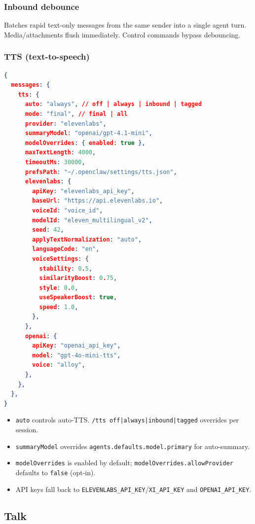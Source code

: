 \subsubsection{Inbound debounce}


Batches rapid text-only messages from the same sender into a single agent turn. Media/attachments flush immediately. Control commands bypass debouncing.

\subsubsection{TTS (text-to-speech)}


\begin{lstlisting}[language=json]
{
  messages: {
    tts: {
      auto: "always", // off | always | inbound | tagged
      mode: "final", // final | all
      provider: "elevenlabs",
      summaryModel: "openai/gpt-4.1-mini",
      modelOverrides: { enabled: true },
      maxTextLength: 4000,
      timeoutMs: 30000,
      prefsPath: "~/.openclaw/settings/tts.json",
      elevenlabs: {
        apiKey: "elevenlabs_api_key",
        baseUrl: "https://api.elevenlabs.io",
        voiceId: "voice_id",
        modelId: "eleven_multilingual_v2",
        seed: 42,
        applyTextNormalization: "auto",
        languageCode: "en",
        voiceSettings: {
          stability: 0.5,
          similarityBoost: 0.75,
          style: 0.0,
          useSpeakerBoost: true,
          speed: 1.0,
        },
      },
      openai: {
        apiKey: "openai_api_key",
        model: "gpt-4o-mini-tts",
        voice: "alloy",
      },
    },
  },
}
\end{lstlisting}


\begin{itemize}
  \item \texttt{auto} controls auto-TTS. \texttt{/tts off|always|inbound|tagged} overrides per session.
  \item \texttt{summaryModel} overrides \texttt{agents.defaults.model.primary} for auto-summary.
  \item \texttt{modelOverrides} is enabled by default; \texttt{modelOverrides.allowProvider} defaults to \texttt{false} (opt-in).
  \item API keys fall back to \texttt{ELEVENLABS\_API\_KEY}/\texttt{XI\_API\_KEY} and \texttt{OPENAI\_API\_KEY}.
\end{itemize}


\hrulefill


\subsection{Talk}


